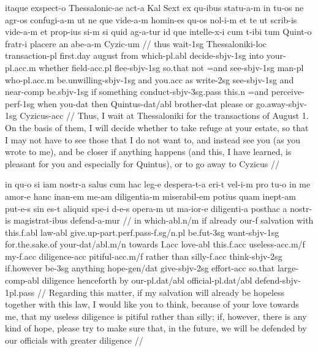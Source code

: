 \documentclass[oneside]{book}
\begin{document}
\vspace{10pt}
\ex[exno=PROIEL 77240]
	\par
	\begingl
		\gla itaque exspect-o Thessalonic-ae act-a Kal Sext ex qu-ibus statu-a-m in tu-os ne agr-os confugi-a-m ut ne que vide-a-m homin-es qu-os nol-i-m et te ut scrib-is vide-a-m et prop-ius si-m si quid ag-a-tur id que intelle-x-i cum t-ibi tum Quint-o fratr-i placere an abe-a-m Cyzic-um //
		\glb thus wait-{\sc 1sg} Thessaloniki-{\sc loc} transaction-{\sc pl} first.day august from which-{\sc pl.abl} decide-{\sc sbjv-1sg} into your-{\sc pl.acc.m} whether field-{\sc acc.pl} flee-{\sc sbjv-1sg} so.that not =and see-{\sc sbjv-1sg} man-{\sc pl} who-{\sc pl.acc.m} be.unwilling-{\sc sbjv-1sg} and you.{\sc acc} as write-{\sc 2sg} see-{\sc sbjv-1sg} and near-{\sc comp} be.{\sc sbjv-1sg} if something conduct-{\sc sbjv-3sg.pass} this.{\sc n} =and  perceive-{\sc perf-1sg} when you-{\sc dat} then Quintus-{\sc dat/abl} brother-{\sc dat} please or go.away-{\sc sbjv-1sg} Cyzicus-{\sc acc} //
		\glft Thus, I wait at Thessaloniki for the transactions of August 1. On the basis of them, I will decide whether to take refuge at your estate, so that I may not have to see those that I do not want to, and instead see you (as you wrote to me), and be closer if anything happens (and this, I have learned, is pleasant for you and especially for Quintus), or to go away to Cyzicus //
	\endgl
\xe 
\vspace{10pt}
\ex[exno=PROIEL 77314]
	\par
	\begingl
		\gla in qu-o si iam nostr-a salus cum hac leg-e despera-t-a eri-t vel-i-m pro tu-o in me amor-e hanc inan-em me-am diligentia-m miserabil-em potius quam inept-am put-e-s sin es-t aliquid spe-i d-e-s opera-m ut ma-ior-e diligenti-a posthac a nostr-is magistrat-ibus defend-a-mur //
		\glb in which-{\sc abl.n/m} if already our-{\sc f} salvation with this.{\sc f.abl} law-{\sc abl} give.up-{\sc part.perf.pass-f.sg/n.pl} be.{\sc fut-3sg} want-{\sc sbjv-1sg} for.the.sake.of your-{\sc dat/abl.m/n} towards I.{\sc acc} love-{\sc abl} this.{\sc f.acc} useless-{\sc acc.m/f} my-{\sc f.acc} diligence-{\sc acc} pitiful-{\sc acc.m/f} rather than silly-{\sc f.acc} think-{\sc sbjv-2sg} if.however be-{\sc 3sg} anything hope-{\sc gen/dat} give-{\sc sbjv-2sg} effort-{\sc acc} so.that large-{\sc comp-abl} diligence henceforth by our-{\sc pl.dat/abl} official-{\sc pl.dat/abl} defend-{\sc sbjv-1pl.pass} //
		\glft Regarding this matter, if my salvation will already be hopeless together with this law, I would like you to think, because of your love towards me, that my useless diligence is pitiful rather than silly; if, however, there is any kind of hope, please try to make sure that, in the future, we will be defended by our officials with greater diligence //
	\endgl
\xe
\vspace{10pt}
\end{document}
